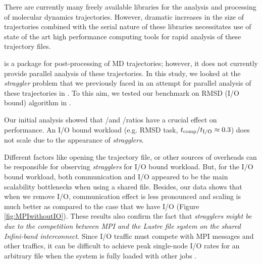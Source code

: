 \label{concl} 
There are currently many freely available libraries for the analysis and processing of molecular dynamics trajectories.
However, dramatic increases in the size of trajectories combined with the serial nature of these libraries necessitates 
use of state of the art high performance computing tools for rapid analysis of these trajectory files. 

 is a package for post-processing of MD trajectories; however, it does not currently provide parallel analysis of these trajectories.
In this study, we looked at the \emph{straggler} problem that we previously faced in an attempt for parallel analysis of these trajectories in  \cite{Khoshlessan:2017ab}.
To this aim, we tested our benchmark on RMSD (I/O bound) algorithm in .

Our initial analysis showed that \tcomp/\tIO and \tcomp/\tcomm ratios have a crucial effect on performance. 
An I/O bound workload (e.g. RMSD task, ${t}_{\text{comp}}/{t}_{\text{I/O}} \approx 0.3$) does not scale due to the appearance of \emph{stragglers}. 

Different factors like opening the trajectory file, or other sources of overheads can be responsible for observing \emph{stragglers} for I/O bound workload.
But, for the I/O bound workload, both communication and I/O appeared to be the main scalability bottlenecks when using a shared file.
Besides, our data shows that when we remove I/O, communication effect is less pronounced and scaling is much better as compared to the case that we have I/O (Figure \ref{fig:MPIwithoutIO}).
These results also confirm the fact that \emph{stragglers might be due to the competition between MPI and the Lustre file system on the shared Infini-band interconnect}.  
Since I/O traffic must compete with MPI messages and other traffics, it can be difficult to achieve peak single-node I/O rates for an arbitrary file when the system is fully loaded with other jobs \cite{VMD2013, Kevin2018}. 



